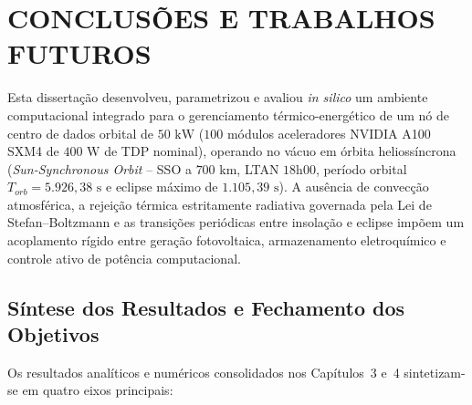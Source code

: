 
\section{CONCLUSÕES E TRABALHOS FUTUROS}
\label{sec:capitulo5_conclusoes}

Esta dissertação desenvolveu, parametrizou e avaliou \textit{in silico} um ambiente computacional integrado para o gerenciamento térmico-energético de um nó de centro de dados orbital de $50\text{ kW}$ ($100$ módulos aceleradores NVIDIA A100 SXM4 de $400\text{ W}$ de TDP nominal), operando no vácuo em órbita heliossíncrona (\textit{Sun-Synchronous Orbit} -- SSO a $700\text{ km}$, LTAN $18\text{h}00$, período orbital $T_{orb} = 5.926{,}38\text{ s}$ e eclipse máximo de $1.105{,}39\text{ s}$). A ausência de convecção atmosférica, a rejeição térmica estritamente radiativa governada pela Lei de Stefan--Boltzmann e as transições periódicas entre insolação e eclipse impõem um acoplamento rígido entre geração fotovoltaica, armazenamento eletroquímico e controle ativo de potência computacional.

\subsection{Síntese dos Resultados e Fechamento dos Objetivos}
\label{sec:sintese_objetivos_cap5}

Os resultados analíticos e numéricos consolidados nos Capítulos~3 e~4 sintetizam-se em quatro eixos principais:

